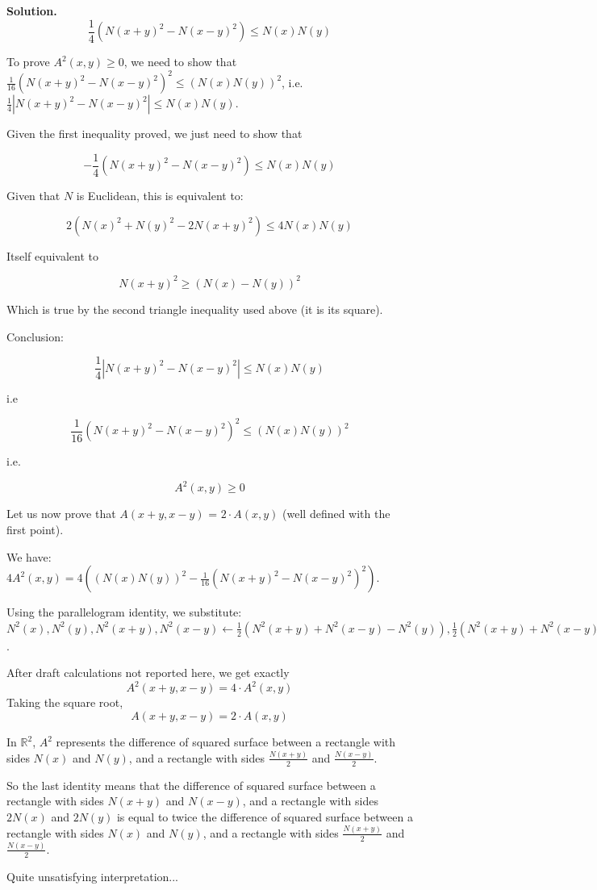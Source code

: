 \documentclass[12pt]{article}
\newcommand{\R}{\mathbb{R}}
\newenvironment{solution}{\vspace{0.2cm} \textbf{Solution.}}{}
\begin{document}
\begin{enumerate}[label=(\alph*)]
\begin{solution}
		$$
		\frac{1}{4} (N(x+y)^2 - N(x-y)^2) \leqslant N(x) N(y)
		$$
		
		To prove $A^2(x,y) \geqslant 0$, we need to show that $\frac{1}{16} (N(x+y)^2 - N(x-y)^2)^2 \leqslant (N(x) N(y))^2$, i.e.\ $\frac{1}{4} | N(x+y)^2 - N(x-y)^2 | \leqslant N(x) N(y)$.
		
		Given the first inequality proved, we just need to show that 
		
		$$- \frac{1}{4} (N(x+y)^2 - N(x-y)^2) \leqslant N(x) N(y)$$
		
		Given that $N$ is Euclidean, this is equivalent to:
		
		$$ 2 ( N(x)^2 + N(y)^2 - 2 N(x+y)^2) \leqslant 4 N(x) N(y)$$
		
		Itself equivalent to
		
		$$ N(x+y)^2 \geqslant (N(x) - N(y))^2$$
		
		Which is true by the second triangle inequality used above (it is its square).
		
		Conclusion:
		
		$$\frac{1}{4} | N(x+y)^2 - N(x-y)^2 | \leqslant N(x) N(y)$$
		
		i.e\
		
		$$\frac{1}{16} (N(x+y)^2 - N(x-y)^2)^2 \leqslant (N(x) N(y))^2$$
		
		i.e.\
		
		$$A^2(x,y) \geqslant 0$$
		
		Let us now prove that $A(x + y, x - y)$ = $2 \cdot A(x, y)$ (well defined with the first point).
		
		We have: $4 A^2(x,y)  = 4((N(x) N(y))^2 - \frac{1}{16} (N(x+y)^2 - N(x-y)^2)^2)$.
		
		Using the parallelogram identity, we substitute: $N^2(x), N^2(y), N^2(x+y), N^2(x-y) \leftarrow \frac{1}{2} (N^2(x+y) + N^2(x-y) - N^2(y)), \frac{1}{2} (N^2(x+y) + N^2(x-y) - N^2(x)), 2(N^2(x) + N^2(y)) - N^2(x-y), 2(N^2(x) + N^2(y)) - N^2(x+y)$.
		
		After draft calculations not reported here, we get exactly $$A^2(x + y, x - y) = 4 \cdot A^2(x, y) $$
		Taking the square root, $$A(x + y, x - y) = 2 \cdot A(x, y)$$

		In $\R^2$, $A^2$ represents the difference of squared surface between a rectangle with sides $N(x)$ and $N(y)$, and a rectangle with sides $\frac{N(x+y)}{2}$ and $\frac{N(x-y)}{2}$.
		
		So the last identity means that the difference of squared surface between a rectangle with sides $N(x+y)$ and $N(x-y)$, and a rectangle with sides $2N(x)$ and $2N(y)$ is equal to twice the difference of squared surface between a rectangle with sides $N(x)$ and $N(y)$, and a rectangle with sides $\frac{N(x+y)}{2}$ and $\frac{N(x-y)}{2}$.
		
		Quite unsatisfying interpretation...
		
		\end{solution}
	\end{enumerate}
	
\end{document}

